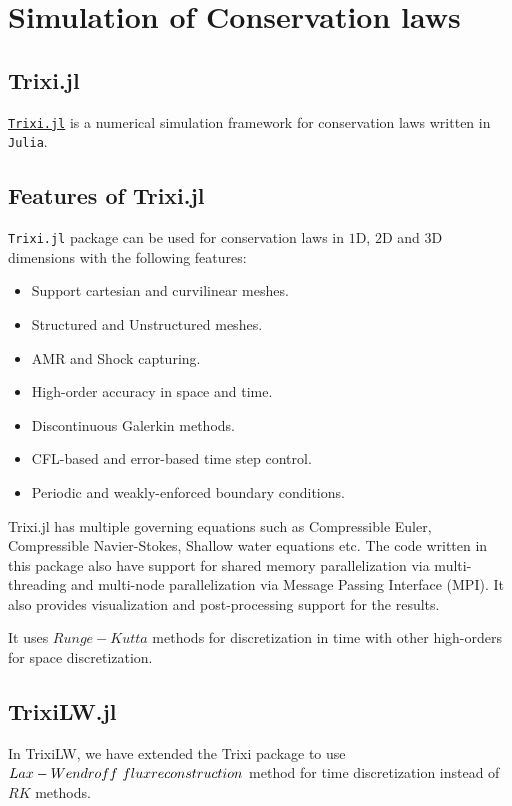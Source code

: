 \documentclass[12pt]{article}
\begin{document}
\section{Simulation of Conservation laws}
\subsection{Trixi.jl}
\href{https://github.com/trixi-framework/Trixi.jl}{\lstinline[language=Python]|Trixi.jl|} is a numerical simulation framework for conservation laws written in 
\lstinline[language=Python]|Julia|.
\subsection{Features of {\ttfamily Trixi.jl}}

\lstinline[language=Python]|Trixi.jl| package can be used for conservation laws in $1$D, $2$D and $3$D dimensions with the following features:
\begin{itemize}
    \item Support cartesian and curvilinear meshes.
    \item Structured and Unstructured meshes.
    \item AMR and Shock capturing.
    \item High-order accuracy in space and time.
    \item Discontinuous Galerkin methods.
    \item CFL-based and error-based time step control.
    \item Periodic and weakly-enforced boundary conditions.
\end{itemize}
{\ttfamily Trixi.jl} has multiple governing equations such as {\ttfamily Compressible Euler, Compressible Navier-Stokes, Shallow water equations} etc.
The code written in this package also have support for {\ttfamily shared memory} parallelization via {\ttfamily multi-threading} and {\ttfamily multi-node} parallelization
via  {\ttfamily Message Passing Interface (MPI)}. It also provides visualization and post-processing support for the results.

It uses $Runge-Kutta$ methods for discretization in time with other high-orders for space discretization.

\subsection{{\ttfamily TrixiLW.jl}}
In {\ttfamily TrixiLW}, we have extended the {\ttfamily Trixi} package to use $Lax-Wendroff~flux\\reconstruction$ method for time discretization instead of $RK$ methods. 
\end{document}
